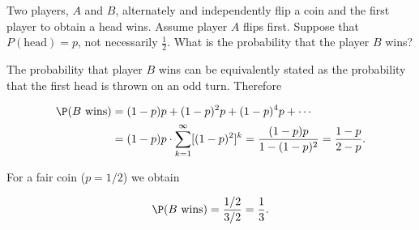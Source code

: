 
\begin{exercise}

Two players, $A$ and $B$, alternately and independently flip a coin and the first player to obtain a head wins.
Assume player $A$ flips first.
Suppose that $P(\text{head}) = p$, not necessarily $\frac{1}{2}$.
What is the probability that the player $B$ wins?

\end{exercise}


\begin{solution}

The probability that player $B$ wins can be equivalently stated as the probability
that the first head is thrown on an odd turn. Therefore

\begin{align*}
  \P(B \text{ wins}) &= (1-p)p + (1-p)^2p + (1-p)^4p + \cdots \\
  &= (1-p)p\cdot \sum_{k=1}^{\infty}[(1-p)^2]^k = \frac{(1-p)p}{1 - (1-p)^2}
  = \frac{1-p}{2-p}.
\end{align*}

For a fair coin ($p = 1/2$) we obtain

\begin{align*}
  \P(B \text{ wins}) = \frac{1/2}{3/2} = \frac{1}{3}.
\end{align*}

\end{solution}

